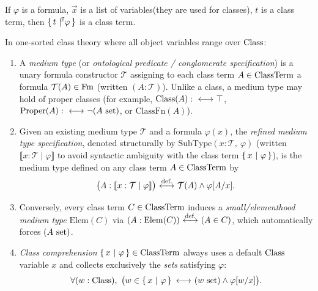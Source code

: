 \begin{constructor}
If $\varphi$ is a formula, $\vec{x}$ is a list of variables(they are used for classes), $t$ is a class term, then $\ccc{\vec{x}}{t}{\varphi}$ is a class term.
\end{constructor}

\begin{definition}
\label{def:medium_type_disambiguation}
In one-sorted class theory where all object variables range over ${\text{Class}}$:
\begin{enumerate}
\item A \emph{medium type} (or \emph{ontological predicate / conglomerate specification}) is a unary formula constructor $\mathcal{T}$ assigning to each class term $A \in {\text{ClassTerm}}$ a formula $\mathcal{T}(A) \in \mathrm{Fm}$ (written $(A : \mathcal{T})$). Unlike a class, a medium type may hold of proper classes (for example, ${\text{Class}}(A) :{\ \longleftrightarrow\ } \top$, $\mathrm{Proper}(A) :{\ \longleftrightarrow\ } \lnot(A\mathrm{\ set})$, or $\mathrm{ClassFn}(A)$).
\item Given an existing medium type $\mathcal{T}$ and a formula $\varphi(x)$, the \emph{refined medium type specification}, denoted structurally by $\mathrm{SubType}(x : \mathcal{T},\ \varphi)$ (written $\llbracket x : \mathcal{T} \mid \varphi \rrbracket$ to avoid syntactic ambiguity with the class term $\left\{\,x\ \middle|\ \varphi\,\right\}$), is the medium type defined on any class term $A \in {\text{ClassTerm}}$ by
\[
\big(A : \llbracket x : \mathcal{T} \mid \varphi \rrbracket\big) \ {\stackrel{{\textrm{def.}}}{\longleftrightarrow}}\  \mathcal{T}(A) \land \varphi[A/x].
\]
\item Conversely, every class term $C \in {\text{ClassTerm}}$ induces a \emph{small/elementhood medium type} $\mathrm{Elem}(C)$ via $(A : \mathrm{Elem}(C)) \ {\stackrel{{\textrm{def.}}}{\longleftrightarrow}}\  (A \in C)$, which automatically forces $(A\mathrm{\ set})$.
\item \emph{Class comprehension} $\left\{\,x\ \middle|\ \varphi\,\right\} \in {\text{ClassTerm}}$ always uses a default ${\text{Class}}$ variable $x$ and collects exclusively the \emph{sets} satisfying $\varphi$:
\[
\forall (w : {\text{Class}}),\ \big( w \in \left\{\,x\ \middle|\ \varphi\,\right\} {\ \longleftrightarrow\ } (w\mathrm{\ set}) \land \varphi[w/x] \big).
\]
\end{enumerate}
\end{definition}


